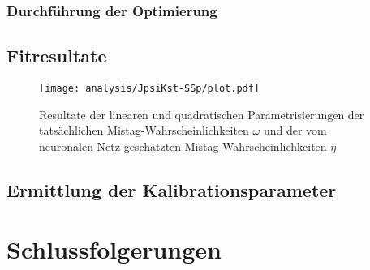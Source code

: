 
\subsubsection{Durchführung der Optimierung}

\subsection{Fitresultate}

\begin{figure}
  \texttt{[image: analysis/JpsiKst-SSp/plot.pdf]}
  \caption{Resultate der linearen und quadratischen Parametrisierungen der tatsächlichen Mistag-Wahrscheinlichkeiten $\omega$ und der vom neuronalen Netz geschätzten Mistag-Wahrscheinlichkeiten $\eta$}
\end{figure}


\subsection{Ermittlung der Kalibrationsparameter}


\section{Schlussfolgerungen}

